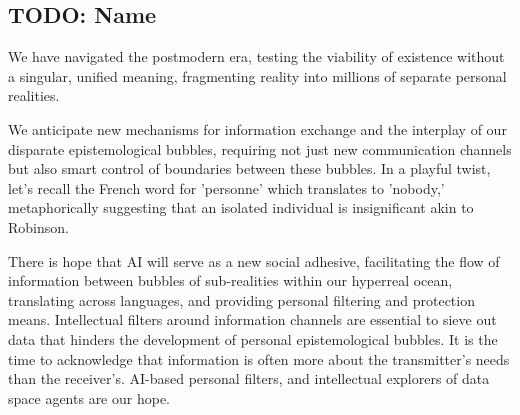 \documentclass[11pt,a4]{article}
\begin{document}
    \subsection{TODO: Name}
    We have navigated the postmodern era, testing the viability of existence without a singular, unified meaning, fragmenting reality into millions of separate personal realities.
    \par
    We anticipate new mechanisms for information exchange and the interplay of our disparate epistemological bubbles, requiring not just new communication channels but also smart control of boundaries between these bubbles.
    In a playful twist, let's recall the French word for 'personne' which translates to 'nobody,' metaphorically suggesting that an isolated individual is insignificant akin to Robinson.
    \par
    There is hope that AI will serve as a new social adhesive, facilitating the flow of information between bubbles of sub-realities within our hyperreal ocean, translating across languages, and providing personal filtering and protection means. Intellectual filters around information channels are essential to sieve out data that hinders the development of personal epistemological bubbles. It is the time to acknowledge that information is often more about the transmitter's needs than the receiver's.  AI-based personal filters, and intellectual explorers of data space agents are our hope.
\end{document}
